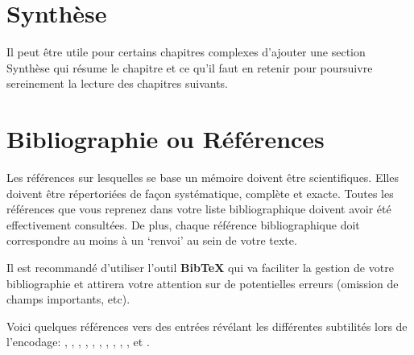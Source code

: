 \section{Synthèse}

Il peut être utile pour certains chapitres complexes d'ajouter une
section \og Synthèse\fg{} qui résume le chapitre et ce qu'il faut en
retenir pour poursuivre sereinement la lecture des chapitres suivants.


\section{ Bibliographie ou Références}

Les références sur lesquelles se base un mémoire doivent être
scientifiques. Elles doivent être répertoriées de façon systématique,
complète et exacte. Toutes les références que vous reprenez dans votre
liste bibliographique doivent avoir été effectivement consultées. De
plus, chaque référence bibliographique doit correspondre au moins à un
‘renvoi' au sein de votre texte.

Il est recommandé d'utiliser l'outil \textbf{BibTeX} qui va faciliter
la gestion de votre bibliographie et attirera votre attention sur de
potentielles erreurs (omission de champs importants, etc).

Voici quelques références vers des entrées révélant les différentes subtilités lors de l'encodage: \cite{talon1972monologue},
\cite{toulemonde1968voisinage},
\cite{talon1975cuisine},
\cite{vanbroeck1980rhetorique},
\cite{crouton1983these},
\cite{talon1965memoire},
\cite{ministere1971rapport},
\cite{lefuneste1978solitude},
\cite{anon1969voisin},
\cite{talon2001blog},
\cite{talon1990oeuvrescompletes} et 
\cite{morose1985silence}.
